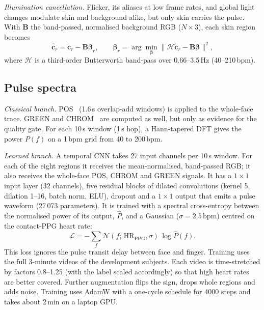 \documentclass[conference]{IEEEtran}
\newcommand{\bpm}{\,bpm}
\begin{document}
\textit{Illumination cancellation.} Flicker, its aliases at low frame rates, and global light changes
modulate skin and background alike, but only skin carries the pulse. With $\mathbf{B}$ the band-passed,
normalised background RGB ($N\times3$), each skin region becomes
\begin{equation}
\hat{\mathbf c}_r=\tilde{\mathbf c}_r-\mathbf{B}\boldsymbol{\beta}_r,\qquad
\boldsymbol{\beta}_r=\arg\min_{\boldsymbol\beta}\big\|\mathcal{H}\tilde{\mathbf c}_r-\mathbf{B}\boldsymbol\beta\big\|^2,
\end{equation}
where $\mathcal H$ is a third-order Butterworth band-pass over 0.66--3.5\,Hz (40--210\bpm).

\subsection{Pulse spectra}
\textit{Classical branch.} POS~\cite{wang2017} (1.6\,s overlap-add windows) is applied to the whole-face
trace. GREEN and CHROM~\cite{dehaan2013} are computed as well, but only as evidence for the quality gate.
For each 10\,s window (1\,s hop), a Hann-tapered DFT gives the power $P(f)$ on a 1\bpm{} grid from 40 to
200\bpm.

\textit{Learned branch.} A temporal CNN takes 27 input channels per 10\,s window. For each of the eight
regions it receives the mean-normalised, band-passed RGB; it also receives the whole-face POS, CHROM and
GREEN signals. It has a $1{\times}1$ input layer (32 channels), five residual blocks of dilated
convolutions (kernel 5, dilation 1--16, batch norm, ELU), dropout and a $1{\times}1$ output that emits a
pulse waveform (27\,073 parameters). It is trained with a spectral cross-entropy between the normalised
power of its output, $\hat P$, and a Gaussian ($\sigma=2.5$\bpm) centred on the contact-PPG heart rate:
\begin{equation}
\mathcal L=-\textstyle\sum_f \mathcal N(f;\,\mathrm{HR}_{\mathrm{PPG}},\sigma)\,\log \hat P(f).
\end{equation}
This loss ignores the pulse transit delay between face and finger. Training uses the full 3-minute
videos of the development subjects. Each video is time-stretched by factors 0.8--1.25 (with the label
scaled accordingly) so that high heart rates are better covered. Further augmentation flips the sign,
drops whole regions and adds noise. Training uses AdamW with a one-cycle schedule for 4000 steps and
takes about 2\,min on a laptop GPU.
\end{document}
